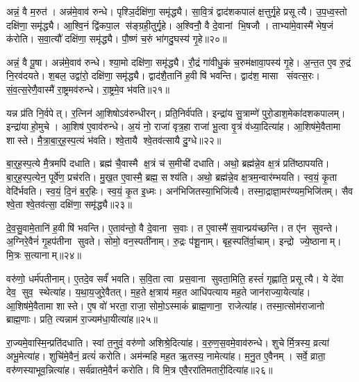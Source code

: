 अन्नं॒ वै म॒रुत॑।
अन्न॑मे॒वाव॑ रुन्धे।
पृश्ञि॒र्दक्षि॑णा॒ समृ॑द्ध्यै।
सा॒वि॒त्रं द्वाद॑शकपालं क्ष॒त्तुर्गृ॒हे प्रसूत्यै।
उ॒प॒ध्व॒स्तो दक्षि॑णा॒ समृ॑द्ध्यै।
आ॒श्वि॒नं द्वि॑कपा॒ल स॑ङ्ग्रही॒तुर्गृ॒हे।
अ॒श्विनौ॒ वै दे॒वानां भि॒षजौ।
ताभ्या॑मे॒वास्मै॑ भेष॒जं क॑रोति।
स॒वा॒त्यौ॑ दक्षि॑णा॒ समृ॑द्ध्यै।
पौ॒ष्णं च॒रुं भा॑गदु॒घस्य॑ गृ॒हे॥२०॥

अन्नं॒ वै पू॒षा।
अन्न॑मे॒वाव॑ रुन्धे।
श्या॒मो दक्षि॑णा॒ समृ॑द्ध्यै।
रौ॒द्रं गा॑वीधु॒कं च॒रुम॑क्षावा॒पस्य॑ गृ॒हे।
अ॒न्त॒त ए॒व रु॒द्रं नि॒रव॑दयते।
श॒बल॒ उद्वा॑रो॒ दक्षि॑णा॒ समृ॑द्ध्यै।
द्वाद॑शै॒तानि॑ ह॒वीषि॑ भवन्ति।
द्वाद॑श॒ मासा संवत्स॒रः।
सं॒व॒त्स॒रेणै॒वास्मै॑ रा॒ष्ट्रमव॑रुन्धे।
रा॒ष्ट्रमे॒व भ॑वति॥२१॥

यन्न प्र॑ति नि॒र्वपेत्।
र॒त्निन॑ आ॒शिषोऽव॑रुन्धीरन्।
प्रति॒निर्व॑पति।
इन्द्रा॑य सु॒त्राम्णे॑ पुरो॒डाश॒मेका॑दशकपालम्।
इन्द्रा॑याहो॒मुचे।
आ॒शिष॑ ए॒वाव॑रुन्धे।
अ॒यं नो॒ राजा॑ वृत्र॒हा राजा॑ भू॒त्वा वृ॒त्रं व॑ध्या॒दित्या॑ह।
आ॒शिष॑मे॒वैतामा शास्ते।
मै॒त्रा॒बा॒र्॒ह॒स्प॒त्यं भ॑वति।
श्वे॒तायै श्वे॒तव॑त्सायै दु॒ग्धे॥२२॥

बा॒र्॒ह॒स्प॒त्ये मै॒त्रमपि॑ दधाति।
ब्रह्म॑ चै॒वास्मै क्ष॒त्रं च॑ स॒मीची॑ दधाति।
अथो॒ ब्रह्म॑न्ने॒व क्ष॒त्रं प्रति॑ष्ठापयति।
बा॒र्॒ह॒स्प॒त्येन॒ पूर्वे॑ण॒ प्रच॑रति।
मु॒ख॒त ए॒वास्मै॒ ब्रह्म॒ सश्य॑ति।
अथो॒ ब्रह्म॑न्ने॒व क्ष॒त्रम॒न्वार॑म्भयति।
स्व॒यं॒ कृ॒ता वेदि॑र्भवति।
स्व॒यं॒ दि॒नं ब॒र्॒हिः।
स्व॒यं॒ कृ॒त इ॒ध्मः।
अन॑भिजितस्या॒भिजि॑त्यै।
तस्मा॒द्राज्ञा॒मर॑ण्यम॒भिजि॑तम्।
सैव श्वे॒ता श्वे॒तव॑त्सा॒ दक्षि॑णा॒ समृ॑द्ध्यै॥२३॥\anuvakamend[र॒त्नि॒त्वाय॒ समृ॑द्ध्यै पष्ठौ॒ही दक्षि॑णा॒ समृ॑द्ध्यै ग्राम॒ण्यो॑ गृ॒हे भा॑गदु॒घस्य॑ गृ॒हे भ॑वति दु॒ग्धे॑ऽभिजि॑त्यै॒ द्वे च॑]
 
दे॒व॒सु॒वामे॒तानि॑ ह॒वीषि॑ भवन्ति।
ए॒ताव॑न्तो॒ वै दे॒वाना स॒वाः।
त ए॒वास्मै॑ स॒वान्प्रय॑च्छन्ति।
त ए॑न सुवन्ते।
अ॒ग्निरे॒वैनं॑ गृ॒हप॑तीना सुवते।
सोमो॒ वन॒स्पती॑नाम्।
रु॒द्रः प॑शू॒नाम्।
बृह॒स्पति॑र्वा॒चाम्।
इन्द्रो ज्ये॒ष्ठानाम्।
मि॒त्रः स॒त्यानाम्॥२४॥

वरु॑णो॒ धर्म॑पतीनाम्।
ए॒तदे॒व सर्वं॑ भवति।
स॒वि॒ता त्वा प्रस॒वाना सुवता॒मिति॒ हस्तं॑ गृह्णाति॒ प्रसूत्यै।
ये दे॑वा देव॒ सुव॒ स्थेत्या॑ह।
य॒था॒य॒जुरे॒वैतत्।
म॒ह॒ते क्ष॒त्राय॑ मह॒त आधि॑पत्याय मह॒ते जान॑राज्या॒येत्या॑ह।
आ॒शिष॑मे॒वैतामा शास्ते।
ए॒ष वो॑ भरता॒ राजा॒ सोमो॒ऽस्माकं॑ ब्राह्म॒णाना॒ राजेत्या॑ह।
तस्मा॒त्सोम॑राजानो ब्राह्म॒णाः।
प्रति॒ त्यन्नाम॑ रा॒ज्यम॑धा॒यीत्या॑ह॥२५॥

रा॒ज्यमे॒वास्मि॒न्प्रति॑दधाति।
स्वां त॒नुवं॒ वरु॑णो अशिश्रे॒दित्या॑ह।
व॒रु॒ण॒स॒वमे॒वाव॑रुन्धे।
शुचेर्मि॒त्रस्य॒ व्रत्या॑ अभू॒मेत्या॑ह।
शुचि॑मे॒वैनं॒ व्रत्यं॑ करोति।
अम॑न्महि मह॒त ऋ॒तस्य॒ नामेत्या॑ह।
म॒नु॒त ए॒वैनम्।
सर्वे॒ व्राता॒ वरु॑णस्याभूव॒न्नित्या॑ह।
सर्व॑व्रातमे॒वैनं॑ करोति।
वि मि॒त्र एवै॒ररा॑तिमतारी॒दित्या॑ह॥२६॥

